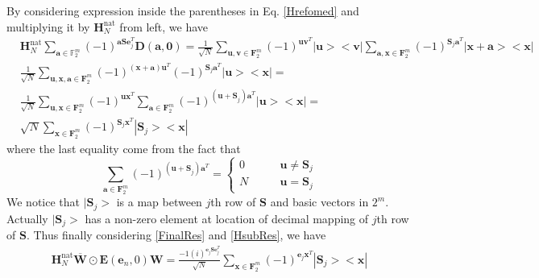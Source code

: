 \documentclass{article}
\begin{document}
By considering expression inside the parentheses in  Eq. \eqref{Hrefomed} and multiplying it by $\mathbf{H}_N^{\text{nat}}$ from left, we have
\begin{align}\label{HsubRes}
	&\mathbf{H}_N^{\text{nat}} \sum_{\mathbf{a} \in \mathbb{F}^m_2}{(-1)^{\mathbf{a S }\mathbf{e}_j^T} \mathbf{D(a,0)}}= \frac{1}{\sqrt{N}} \sum_{\mathbf{u}, \mathbf{v} \in \mathbf{F}_2^m}{\left(-1\right)^{\mathbf{u} \mathbf{v}^T } |\mathbf{u}><\mathbf{v}|} \sum_{\mathbf{a}, \mathbf{x} \in \mathbf{F}_2^m}{\left(-1\right)^{\mathbf{S}_j \mathbf{a}^T } |\mathbf{x+a}><\mathbf{x}|} \nonumber \\
	& \frac{1}{\sqrt{N}} \sum_{\mathbf{u}, \mathbf{x}, \mathbf{a} \in \mathbf{F}_2^m}{(-1)^{(\mathbf{x+a})\mathbf{u}^T} (-1)^{\mathbf{S}_j \mathbf{a}^T}|\mathbf{u}><\mathbf{x}| }= \nonumber \\ 
	&\frac{1}{\sqrt{N}} \sum_{\mathbf{u}, \mathbf{x} \in \mathbf{F}_2^m}{(-1)^{\mathbf{u} \mathbf{x}^T} \sum_{ \mathbf{a} \in \mathbf{F}_2^m}{(-1)^{(\mathbf{u+S}_j)\mathbf{a}^T}} |\mathbf{u}><\mathbf{x}| } = \nonumber \\
	&\sqrt{N} \sum_{ \mathbf{x} \in \mathbf{F}_2^m}{(-1)^{\mathbf{S}_j \mathbf{x}^T} |\mathbf{S}_j><\mathbf{x}| } 
\end{align}
where the last equality come from the fact that 
\begin{equation}
	\sum_{ \mathbf{a} \in \mathbf{F}_2^m}{(-1)^{(\mathbf{u+S}_j)\mathbf{a}^T}} = \left\{  
	\begin{align}
		0 & \qquad \mathbf{u} \neq \mathbf{S}_j \\
		N & \qquad \mathbf{u} = \mathbf{S}_j
	\end{align}
	\right.
\end{equation}
We notice that $|\mathbf{S}_j>$ is a map between $j$th row of $\mathbf{S}$ and basic vectors in $2^m$. Actually $|\mathbf{S}_j>$ has a non-zero element at location of decimal mapping of $j$th row of $\mathbf{S}$. Thus finally considering \eqref{FinalRes} and \eqref{HsubRes}, we have
\begin{align}
	\mathbf{H}_N^{\text{nat}}\overline{\mathbf{W}} \odot \mathbf{E}(\mathbf{e}_n, 0)\mathbf{W} = \frac{-1 (i)^{\mathbf{e}_j \mathbf{S e}_j^T}}{\sqrt{N}} \sum_{ \mathbf{x} \in \mathbf{F}_2^m}{(-1)^{\mathbf{e}_j \mathbf{x}^T} |\mathbf{S}_j><\mathbf{x}| }
\end{align}
	
\end{document}
